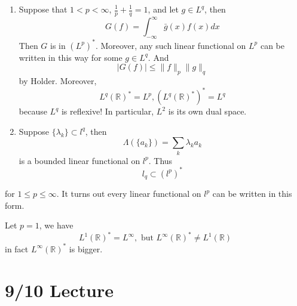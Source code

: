 \documentclass[openany]{book}
\newcommand{\R}{\mathbb{R}}
\begin{document}
\begin{example}
    \begin{enumerate}
        \item Suppose that $1<p<\infty$, $\frac{1}{p}+\frac{1}{q}=1$, and let $g\in L^q$, then 
        \begin{equation*}
            G(f)=\int_{-\infty}^\infty\bar{g}(x)f(x)dx
        \end{equation*}
        Then $G$ is in $(L^p)^*$. Moreover, any such linear functional on $L^p$ can be written in this way for some $g\in L^q$. And 
        \begin{equation*}
            |G(f)|\leq\|f\|_p\|g\|_q
        \end{equation*}
        by Holder. Moreover, 
        \begin{equation*}
            L^q(\R)^*=L^p, (L^q(\R)^*)^*=L^q
        \end{equation*}
        because $L^q$ is reflexive! In particular, $L^2$ is its own dual space.
        \item Suppose $\{\lambda_k\}\subset l^q$, then 
        \begin{equation*}
            \Lambda(\{a_k\})=\sum_k\lambda_ka_k
        \end{equation*}
        is a bounded linear functional on $l^p$. Thus 
        \begin{equation*}
            l_q\subset (l^p)^*
        \end{equation*}
    \end{enumerate}
    for $1\leq p\leq\infty$. It turns out every linear functional on $l^p$ can be written in this form.
\end{example}
\begin{example}
    Let $p=1$, we have 
    \begin{equation*}
        L^1(\R)^*=L^\infty, \text{ but } L^\infty(\R)^*\neq L^1(\R)
    \end{equation*}
    in fact $L^\infty(\R)^*$ is bigger. 
\end{example}



\section{9/10 Lecture}
\end{document}
